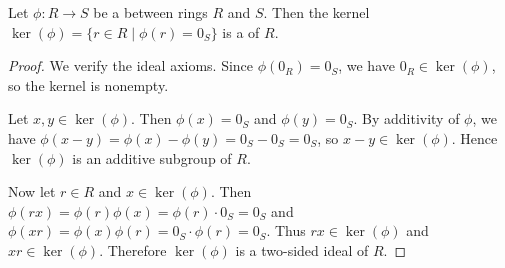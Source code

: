 \begin{proposition} \label{proposition:kernel_of_ring_homomorphism_is_an_ideal}
Let $\phi: R \to S$ be a  between rings $R$ and $S$. Then the kernel $\operatorname{ker}(\phi) = \{ r \in R \mid \phi(r) = 0_S \}$ is a  of $R$.
\end{proposition}

\begin{proof}
We verify the ideal axioms. Since $\phi(0_R) = 0_S$, we have $0_R \in \operatorname{ker}(\phi)$, so the kernel is nonempty.

Let $x, y \in \operatorname{ker}(\phi)$. Then $\phi(x) = 0_S$ and $\phi(y) = 0_S$. By additivity of $\phi$, we have $\phi(x - y) = \phi(x) - \phi(y) = 0_S - 0_S = 0_S$, so $x - y \in \operatorname{ker}(\phi)$. Hence $\operatorname{ker}(\phi)$ is an additive subgroup of $R$.

Now let $r \in R$ and $x \in \operatorname{ker}(\phi)$. Then $\phi(rx) = \phi(r)\phi(x) = \phi(r) \cdot 0_S = 0_S$ and $\phi(xr) = \phi(x)\phi(r) = 0_S \cdot \phi(r) = 0_S$. Thus $rx \in \operatorname{ker}(\phi)$ and $xr \in \operatorname{ker}(\phi)$. Therefore $\operatorname{ker}(\phi)$ is a two-sided ideal of $R$.
\end{proof}